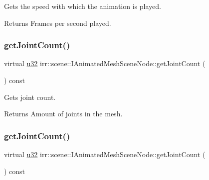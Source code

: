 Gets the speed with which the animation is played. 

\begin{DoxyReturn}{Returns}
Frames per second played. 
\end{DoxyReturn}
\mbox{\label{classirr_1_1scene_1_1IAnimatedMeshSceneNode_a146657063c055fcb951ca6fd66171589}} 
\subsubsection{\texorpdfstring{get\+Joint\+Count()}{getJointCount()}\hspace{0.1cm}{\footnotesize\ttfamily [1/2]}}
{\footnotesize\ttfamily virtual \hyperlink{namespaceirr_a0416a53257075833e7002efd0a18e804}{u32} irr\+::scene\+::\+I\+Animated\+Mesh\+Scene\+Node\+::get\+Joint\+Count (\begin{DoxyParamCaption}{ }\end{DoxyParamCaption}) const\hspace{0.3cm}{\ttfamily [pure virtual]}}



Gets joint count. 

\begin{DoxyReturn}{Returns}
Amount of joints in the mesh. 
\end{DoxyReturn}
\mbox{\label{classirr_1_1scene_1_1IAnimatedMeshSceneNode_a146657063c055fcb951ca6fd66171589}} 
\subsubsection{\texorpdfstring{get\+Joint\+Count()}{getJointCount()}\hspace{0.1cm}{\footnotesize\ttfamily [2/2]}}
{\footnotesize\ttfamily virtual \hyperlink{namespaceirr_a0416a53257075833e7002efd0a18e804}{u32} irr\+::scene\+::\+I\+Animated\+Mesh\+Scene\+Node\+::get\+Joint\+Count (\begin{DoxyParamCaption}{ }\end{DoxyParamCaption}) const\hspace{0.3cm}{\ttfamily [pure virtual]}}



